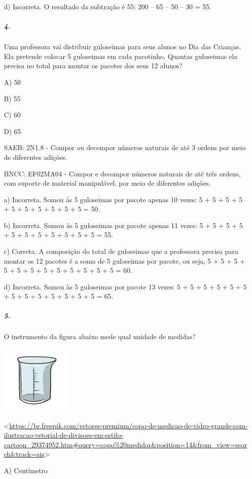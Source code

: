 d) Incorreta. O resultado da subtração é 55: 200 -- 65 -- 50 -- 30 = 55.

\subparagraph{4. }\label{section-148}

Uma professora vai distribuir guloseimas para seus alunos no Dia das
Crianças. Ela pretende colocar 5 guloseimas em cada pacotinho. Quantas
guloseimas ela precisa no total para montar os pacotes dos seus 12
alunos?

A) 50

B) 55

C) 60

D) 65

SAEB: 2N1.8 - Compor ou decompor números naturais de até 3 ordens por
meio de diferentes adições.

BNCC: EF02MA04 - Compor e decompor números naturais de até três ordens,
com suporte de material manipulável, por meio de diferentes adições.

a) Incorreta. Somou às 5 guloseimas por pacote apenas 10 vezes: 5 + 5 +
5 + 5 + 5 + 5 + 5 + 5 + 5 + 5 = 50.

b) Incorreta. Somou às 5 guloseimas por pacote apenas 11 vezes: 5 + 5 +
5 + 5 + 5 + 5 + 5 + 5 + 5 + 5 + 5 = 55.

c) Correta. A composição do total de guloseimas que a professora precisa
para montar os 12 pacotes é a soma de 5 guloseimas por pacote, ou seja,
5 + 5 + 5 + 5 + 5 + 5 + 5 + 5 + 5 + 5 + 5 + 5 = 60.

d) Incorreta. Somou às 5 guloseimas por pacote 13 vezes: 5 + 5 + 5 + 5 +
5 + 5 + 5 + 5 + 5 + 5 + 5 + 5 + 5 = 65.

\subparagraph{5. }\label{section-149}

O instrumento da figura abaixo mede qual unidade de medidas?

\includegraphics[width=1.36285in,height=1.36285in]{media/image165.png}

\textless{}\url{https://br.freepik.com/vetores-premium/copo-de-medicao-de-vidro-grande-com-ilustracao-vetorial-de-divisoes-em-estilo-cartoon_29374952.htm\#query=copo\%20medidor\&position=14\&from_view=search\&track=ais}\textgreater{}

A) Centímetro

